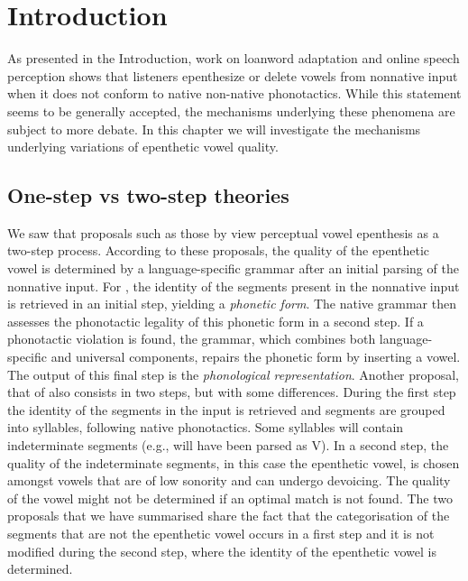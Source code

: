 

\section{Introduction}
As presented in the Introduction, work on loanword adaptation and online speech perception shows that listeners epenthesize or delete vowels from nonnative input when it does not conform to native non-native phonotactics.
While this statement seems to be generally accepted, the mechanisms underlying these phenomena are subject to more debate. In this chapter we will investigate the mechanisms underlying variations of epenthetic vowel quality. 


\subsection{One-step vs two-step theories}
We saw that proposals such as those by \cite{berent2007, monahan2009} view perceptual vowel epenthesis as a two-step process.
According to these proposals, the quality of the epenthetic vowel is determined by a language-specific grammar after an initial parsing of the nonnative input.
For \cite{berent2007}, the identity of the segments present in the nonnative input is retrieved in an initial step, yielding a \textit{phonetic form}. The native grammar then assesses the phonotactic legality of this phonetic form in a second step. If a phonotactic violation is found, the grammar, which combines both language-specific and universal components, repairs the phonetic form by inserting a vowel. The output of this final step is the \textit{phonological representation}.
Another proposal, that of \cite{monahan2009} also consists in two steps, but with some differences. During the first step the identity of the segments in the input is retrieved and segments are grouped into syllables, following native phonotactics. Some syllables will contain indeterminate segments (e.g.,  will have been parsed as V). In a second step, the quality of the indeterminate segments, in this case the epenthetic vowel, is chosen amongst vowels that are of low sonority and can undergo devoicing. The quality of the vowel might not be determined if an optimal match is not found.
The two proposals that we have summarised share the fact that the categorisation of the segments that are not the epenthetic vowel occurs in a first step and it is not modified during the second step, where the identity of the epenthetic vowel is determined.

